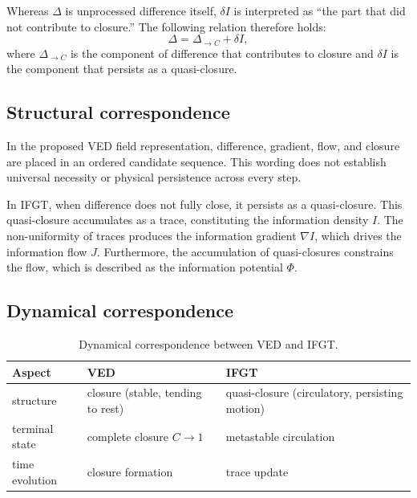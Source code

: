 Whereas $\Delta$ is unprocessed difference itself, $\delta I$ is interpreted as ``the part that did not contribute to closure.'' The following relation therefore holds:
\begin{equation}
\Delta = \Delta_{\to C} + \delta I,
\label{eq:delta_decomposition}
\end{equation}
where $\Delta_{\to C}$ is the component of difference that contributes to closure and $\delta I$ is the component that persists as a quasi-closure.

\subsection{Structural correspondence}
\label{subsec:structural_correspondence}

In the proposed VED field representation, difference, gradient, flow, and
closure are placed in an ordered candidate sequence. This wording does not
establish universal necessity or physical persistence across every step.

In IFGT, when difference does not fully close, it persists as a quasi-closure. This quasi-closure accumulates as a trace, constituting the information density $I$. The non-uniformity of traces produces the information gradient $\nabla I$, which drives the information flow $J$. Furthermore, the accumulation of quasi-closures constrains the flow, which is described as the information potential $\Phi$.

\subsection{Dynamical correspondence}
\label{subsec:dynamical_correspondence}

\begin{table}[h]
  \centering
  \begin{tabular}{l l l}
    \hline
    \textbf{Aspect} & \textbf{VED} & \textbf{IFGT} \\
    \hline
    structure & closure (stable, tending to rest) & quasi-closure (circulatory, persisting motion) \\
    terminal state & complete closure $C \to 1$ & metastable circulation \\
    time evolution & closure formation & trace update \\
    \hline
  \end{tabular}
  \caption{Dynamical correspondence between VED and IFGT.}
  \label{tab:dynamical_correspondence}
\end{table}

